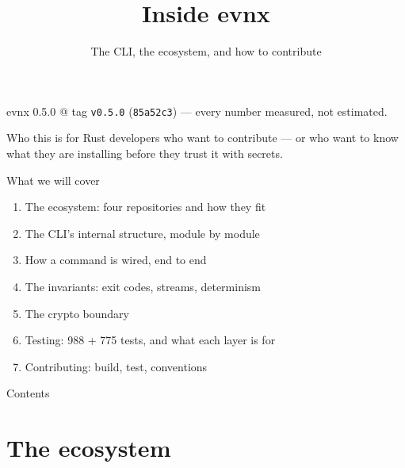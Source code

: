 \documentclass[aspectratio=169,10pt]{beamer}
\title{Inside evnx}
\subtitle{The CLI, the ecosystem, and how to contribute}
\date{}
\begin{document}
\begin{frame}[plain]
  \titlepage
  \begin{center}\footnotesize
  \textcolor{evnxMuted}{evnx 0.5.0 @ tag \texttt{v0.5.0} (\texttt{85a52c3}) --- every number measured,
  not estimated.}
  \end{center}
\end{frame}

\begin{frame}{Who this is for}
  Rust developers who want to contribute --- or who want to know what they are
  installing before they trust it with secrets.

  \vspace{0.8em}
  \begin{block}{What we will cover}
    \begin{enumerate}
      \item The ecosystem: four repositories and how they fit
      \item The CLI's internal structure, module by module
      \item How a command is wired, end to end
      \item The invariants: exit codes, streams, determinism
      \item The crypto boundary
      \item Testing: 988 + 775 tests, and what each layer is for
      \item Contributing: build, test, conventions
    \end{enumerate}
  \end{block}
\end{frame}

\begin{frame}{Contents}\tableofcontents[hideallsubsections]\end{frame}

\section{The ecosystem}
\end{document}
